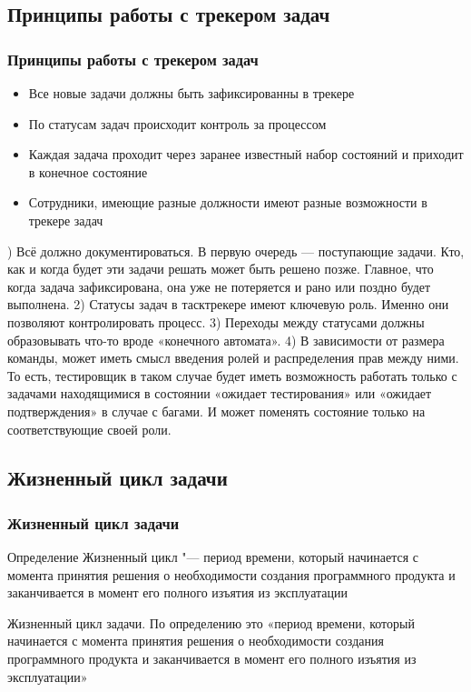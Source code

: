 \documentclass{../industrial-development}
\begin{document}
\subsection{Принципы работы с трекером задач}

\begin{frame} \frametitle{Принципы работы с трекером задач}
	\begin{itemize}
		\item Все новые задачи должны быть зафиксированны в трекере
		\item По статусам задач происходит контроль за процессом
		\item Каждая задача проходит через заранее известный набор состояний и приходит в конечное состояние
		\item Сотрудники, имеющие разные должности имеют разные возможности в трекере задач
	\end{itemize}
\end{frame}

) Всё должно документироваться. В первую очередь — поступающие задачи. Кто, как и когда будет эти задачи решать может быть решено позже. Главное, что когда задача зафиксирована, она уже не потеряется и рано или поздно будет выполнена.
2) Статусы задач в тасктрекере имеют ключевую роль. Именно они позволяют контролировать процесс.
3) Переходы между статусами должны образовывать что-то вроде «конечного автомата».
4) В зависимости от размера команды, может иметь смысл введения ролей и распределения прав между ними. То есть, тестировщик в таком случае будет иметь возможность работать только с задачами находящимися в состоянии «ожидает тестирования» или «ожидает подтверждения» в случае с багами. И может поменять состояние только на соответствующие своей роли.

\subsection{Жизненный цикл задачи}

\begin{frame} \frametitle{Жизненный цикл задачи}
\begin{block}{Определение}
    Жизненный цикл "--- период времени, который начинается с момента принятия решения о необходимости создания программного продукта и заканчивается в момент его полного изъятия из эксплуатации
  \end{block}
\end{frame}

\lecturenotes
Жизненный цикл задачи. По определению это «период времени, который начинается с момента принятия решения о необходимости создания программного продукта и заканчивается в момент его полного изъятия из эксплуатации»
\end{document}
